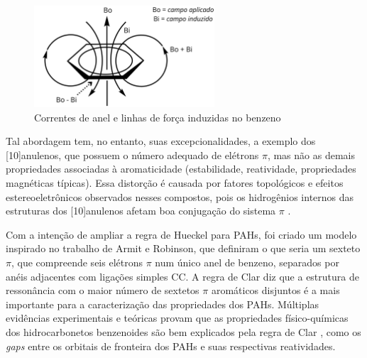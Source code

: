\begin{figure}[htb]
	\caption{\label{fig:magneticsus} Correntes de anel e linhas de força induzidas no benzeno}
	\begin{center}
		\includegraphics[width=0.60\textwidth]{images/magneticoPascal.png}
	\end{center}
\end{figure}

Tal abordagem tem, no entanto, suas excepcionalidades, a exemplo dos [10]anulenos, que possuem o número adequado de elétrons $\pi$, mas não as demais propriedades associadas à aromaticidade (estabilidade, reatividade, propriedades magnéticas típicas). Essa distorção é causada por fatores topológicos e efeitos estereoeletrônicos observados nesses compostos, pois os hidrogênios internos das estruturas dos [10]anulenos afetam boa conjugação do sistema $\pi$ \autocite{Caramori2006}. 

Com a intenção de ampliar a regra de Hueckel para \gls{PAHs}, foi criado um modelo inspirado no trabalho de Armit e Robinson, que definiram o que seria um sexteto $\pi$, que compreende seis elétrons $\pi$ num único anel de benzeno, separados por anéis adjacentes com ligações simples CC. A regra de Clar diz que a estrutura de ressonância com o maior número de sextetos $\pi$ aromáticos disjuntos é a mais importante para a caracterização das propriedades dos \gls{PAHs}. Múltiplas evidências experimentais e teóricas provam que as propriedades físico-químicas dos hidrocarbonetos benzenoides são bem explicados pela regra de Clar \autocite{Sola2013, Clar1958}, como os \textit{gaps} entre os orbitais de fronteira dos \gls{PAHs} e suas respectivas reatividades. 

